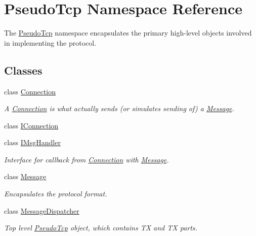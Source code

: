 \hypertarget{namespacePseudoTcp}{
\section{PseudoTcp Namespace Reference}
\label{namespacePseudoTcp}
}


The \hyperlink{namespacePseudoTcp}{PseudoTcp} namespace encapsulates the primary high-\/level objects involved in implementing the protocol.  


\subsection*{Classes}
\begin{DoxyCompactItemize}
\item 
class \hyperlink{classPseudoTcp_1_1Connection}{Connection}
\begin{DoxyCompactList}\small\item\em A \hyperlink{classPseudoTcp_1_1Connection}{Connection} is what actually sends (or simulates sending of) a \hyperlink{classPseudoTcp_1_1Message}{Message}. \item\end{DoxyCompactList}\item 
class \hyperlink{classPseudoTcp_1_1IConnection}{IConnection}
\item 
class \hyperlink{classPseudoTcp_1_1IMsgHandler}{IMsgHandler}
\begin{DoxyCompactList}\small\item\em Interface for callback from \hyperlink{classPseudoTcp_1_1Connection}{Connection} with \hyperlink{classPseudoTcp_1_1Message}{Message}. \item\end{DoxyCompactList}\item 
class \hyperlink{classPseudoTcp_1_1Message}{Message}
\begin{DoxyCompactList}\small\item\em Encapsulates the protocol format. \item\end{DoxyCompactList}\item 
class \hyperlink{classPseudoTcp_1_1MessageDispatcher}{MessageDispatcher}
\begin{DoxyCompactList}\small\item\em Top level \hyperlink{namespacePseudoTcp}{PseudoTcp} object, which contains TX and TX parts. \item\end{DoxyCompactList}\item 

\end{DoxyCompactItemize}
